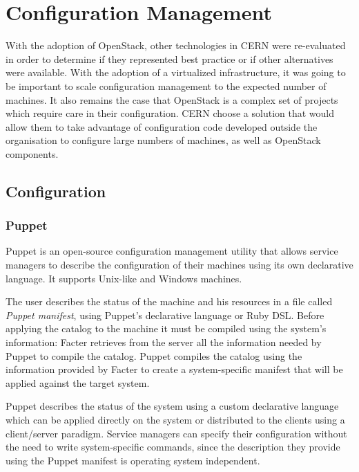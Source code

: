 \section{Configuration Management}

With the adoption of OpenStack, other technologies in CERN were 
re-evaluated in order to determine if they represented best practice or
if other alternatives were available. With the adoption of a virtualized
infrastructure, it was going to be important to scale configuration
management to the expected number of machines. It also remains the case
that OpenStack is a complex set of projects which require care in their
configuration. CERN choose a solution that would allow them to take
advantage of configuration code developed outside the organisation to
configure large numbers of machines, as well as OpenStack components.

\subsection{Configuration}

\subsubsection{Puppet}

Puppet \cite{PuppetWebsite} is an open-source configuration management
utility that allows service managers to describe the configuration of
their machines using its own declarative language. It supports Unix-like
and Windows machines.

The user describes the status of the machine and his resources in a file
called \textit{Puppet manifest}, using Puppet's declarative language or
Ruby DSL. Before applying the catalog to the machine it must be compiled
using the system's information: Facter \cite{FacterWebsite} retrieves from
the server all the information needed by Puppet to compile the catalog.
Puppet compiles the catalog using the information provided by Facter to
create a system-specific manifest that will be applied against the target
system.

Puppet describes the status of the system using a custom declarative
language which can be applied directly on the system or distributed to the
clients using a client/server paradigm. Service managers can specify their
configuration without the need to write system-specific commands, since
the description they provide using the Puppet manifest is operating system
independent.


